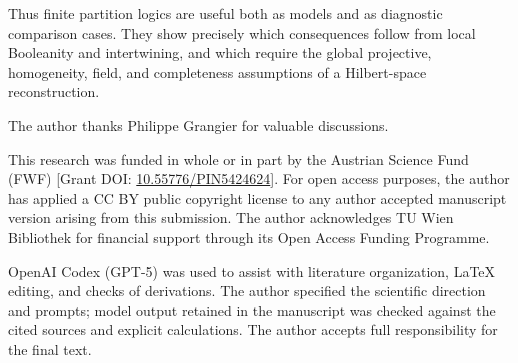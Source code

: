 \documentclass[
  aps,
  pra,
  twocolumn,
  amsmath,
  amssymb,
  longbibliography,
  nofootinbib,
  floatfix
]{revtex4-2}
\begin{document}
Thus finite partition logics are useful both as models and as diagnostic
comparison cases.  They show precisely which consequences follow from local
Booleanity and intertwining, and which require the global projective,
homogeneity, field, and completeness assumptions of a Hilbert-space
reconstruction.

\begin{acknowledgments}
\small
The author thanks Philippe Grangier for valuable discussions.

This research was funded in whole or in part by the Austrian Science Fund
(FWF) [Grant DOI:
\href{https://doi.org/10.55776/PIN5424624}{10.55776/PIN5424624}].  For open
access purposes, the author has applied a CC BY public copyright license to any
author accepted manuscript version arising from this submission.  The author
acknowledges TU Wien Bibliothek for financial support through its Open Access
Funding Programme.

OpenAI Codex (GPT-5) was used to assist with literature organization, \LaTeX{}
editing, and checks of derivations.  The author specified the scientific
direction and prompts; model output retained in the manuscript was checked
against the cited sources and explicit calculations.  The author accepts full
responsibility for the final text.
\end{acknowledgments}

\clearpage

\end{document}
